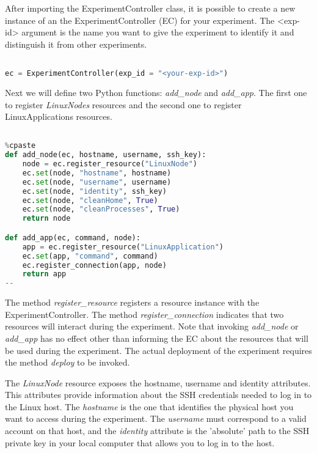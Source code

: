 After importing the ExperimentController class, it is possible to 
create a new instance of an the ExperimentController (EC) for 
your experiment. 
The <exp-id> argument is the name you want to give the experiment 
to identify it and distinguish it from other experiments. 

\begin{lstlisting}[language=Python]

ec = ExperimentController(exp_id = "<your-exp-id>")

\end{lstlisting}

Next we will define two Python functions: \emph{add\_node} and \emph{add\_app}.
The first one to register \textit{LinuxNodes} resources and the second one to 
register LinuxApplications resources. 

\begin{lstlisting}[language=Python]

%cpaste
def add_node(ec, hostname, username, ssh_key):
    node = ec.register_resource("LinuxNode")
    ec.set(node, "hostname", hostname)
    ec.set(node, "username", username)
    ec.set(node, "identity", ssh_key)
    ec.set(node, "cleanHome", True)
    ec.set(node, "cleanProcesses", True)
    return node

def add_app(ec, command, node):
    app = ec.register_resource("LinuxApplication")
    ec.set(app, "command", command)
    ec.register_connection(app, node)
    return app
--

\end{lstlisting}

The method \textit{register\_resource} registers a resource instance with the 
ExperimentController. The method \textit{register\_connection} indicates
that two resources will interact during the experiment. 
Note that invoking \textit{add\_node} or \textit{add\_app} has no effect other
than informing the EC about the resources that will be used during the experiment.
The actual deployment of the experiment requires the method \textit{deploy} to
be invoked.

The \textit{LinuxNode} resource exposes the hostname, username and identity 
attributes. This attributes provide information about the SSH credentials 
needed to log in to the Linux host. 
The \textit{hostname} is the one that identifies the physical host you want
to access during the experiment. The \textit{username} must correspond to a
valid account on that host, and the \textit{identity} attribute is the 
'absolute' path to the SSH private key in your local computer that allows you 
to log in to the host.

